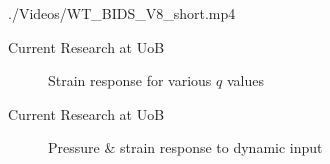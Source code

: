 \documentclass[aspectratio=169]{beamer}            %
\begin{document}
\begin{frame}[plain]

  \centering
    {./Videos/WT_BIDS_V8_short.mp4}
	
\end{frame}

\begin{frame}{Current Research at UoB}

  \begin{figure}[!htb]
    \centering
		
		\caption{Strain response for various ${q}$ values}
		\label{fig:StrainResponse2q}
  \end{figure}

\end{frame}

%
%

\begin{frame}{Current Research at UoB}

  \begin{figure}[!htb]
    \centering
		
		\caption{Pressure \& strain response to dynamic input}
		\label{fig:DistSens_DynResponse}
  \end{figure}

\end{frame}
\end{document}
